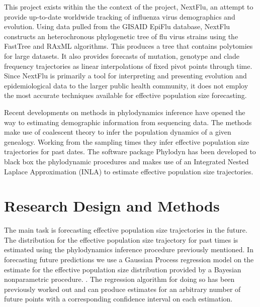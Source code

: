 \documentclass[10pt, oneside]{article}
\begin{document}
This project exists within the the context of the project, NextFlu, an attempt to provide up-to-date worldwide tracking of influenza virus demographics and evolution\cite{neher_bedford_2015}. Using data pulled from the GISAID EpiFlu database, NextFlu constructs an heterochronous phylogenetic tree of flu virus strains using the FastTree \cite{price_dehal_arkin_2009} and RAxML\cite{stamatakis_2014} algorithms. This produces a tree that contains polytomies for large datasets. It also provides forecasts of mutation, genotype and clade frequency trajectories as linear interpolations of fixed pivot points through time. Since NextFlu is primarily a tool for interpreting and presenting evolution and epidemiological data to the larger public health community, it does not employ the most accurate techniques available for effective population size forecasting. 

Recent developments on methods in phylodynamics inference have opened the way to estimating demographic information from sequencing data. The methods make use of coalescent theory to infer the population dynamics of a given genealogy. Working from the sampling times they infer effective population size trajectories for past dates\cite{palacios_minin_2012}. The software package Phylodyn has been developed to black box the phylodynamic procedures and makes use of an Integrated Nested Laplace Approximation (INLA) to estimate effective population size trajectories\cite{karcher_palacios_lan_minin_2016}. 

\section{Research Design and Methods}

The main task is forecasting effective population size trajectories in the future. The distribution for the effective population size trajectory for past times is estimated using the phylodynamics inference procedure previously mentioned. In forecasting future predictions we use a Gaussian Process regression model on the estimate for the effective population size distribution provided by a Bayesian nonparametric procedure. \cite{wang_2017}. The regression algorithm for doing so has been previously worked out and can produce estimates for an arbitrary number of future points with a corresponding confidence interval on each estimation\cite{rasmussen_williams_undefined_2008}.
\end{document}
